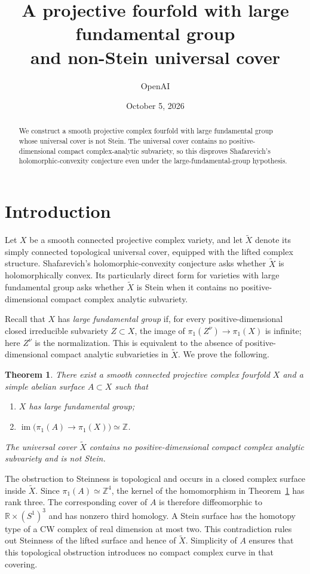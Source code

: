 \documentclass[11pt,reqno]{amsart}
\title[Large fundamental group and non-Stein universal cover]{A projective fourfold with large fundamental group\protect\\
and non-Stein universal cover}
\author{OpenAI}
\date{October 5, 2026}
\numberwithin{equation}{section}
\newtheorem{theorem}{Theorem}[section]
\theoremstyle{definition}
\theoremstyle{remark}
\newcommand{\R}{\mathbb R}
\newcommand{\Z}{\mathbb Z}
\DeclareMathOperator{\im}{im}
\begin{document}
\begin{abstract}
We construct a smooth projective complex fourfold with large fundamental group
whose universal cover is not Stein. The universal cover contains no
positive-dimensional compact complex-analytic subvariety, so this disproves
Shafarevich's holomorphic-convexity conjecture even under the
large-fundamental-group hypothesis.
\end{abstract}
\maketitle
\tableofcontents
\section{Introduction}\label{sec:introduction}

Let $X$ be a smooth connected projective complex variety, and let
$\widetilde X$ denote its simply connected topological universal cover,
equipped with the lifted complex structure.  Shafarevich's
holomorphic-convexity conjecture asks whether $\widetilde X$ is
holomorphically convex.  Its particularly direct form for varieties with
large fundamental group asks whether $\widetilde X$ is Stein when it
contains no positive-dimensional compact complex analytic subvariety.

Recall that $X$ has \emph{large fundamental group} if, for every
positive-dimensional closed irreducible subvariety $Z\subset X$, the image
of $\pi_1(Z^\nu)\to\pi_1(X)$ is infinite; here $Z^\nu$ is the
normalization.  This is equivalent to the absence of positive-dimensional
compact analytic subvarieties in $\widetilde X$.  We prove the following.

\begin{theorem}\label{thm:main}
There exist a smooth connected projective complex fourfold $X$ and a
simple abelian surface $A\subset X$ such that
\begin{enumerate}
\item $X$ has large fundamental group;
\item $\im\bigl(\pi_1(A)\to\pi_1(X)\bigr)\simeq\Z$.
\end{enumerate}
The universal cover $\widetilde X$ contains no positive-dimensional
compact complex analytic subvariety and is not Stein.
\end{theorem}

The obstruction to Steinness is topological and occurs in a closed
complex surface inside $\widetilde X$.  Since $\pi_1(A)\simeq\Z^4$,
the kernel of the homomorphism in Theorem~\ref{thm:main} has rank three.
The corresponding cover of $A$ is therefore diffeomorphic to
$\R\times(S^1)^3$ and has nonzero third homology.  A Stein surface has
the homotopy type of a CW complex of real dimension at most two.
This contradiction rules out Steinness of the lifted surface and hence
of $\widetilde X$.  Simplicity of $A$ ensures that this topological
obstruction introduces no compact complex curve in that covering.
\end{document}

